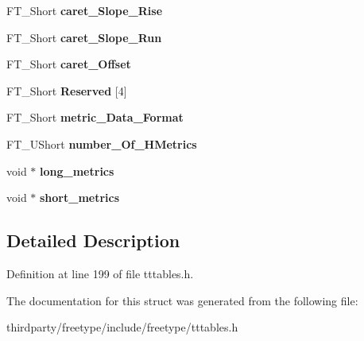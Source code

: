 \begin{DoxyCompactItemize}
\item 
\mbox{\label{struct_t_t___hori_header___aeb43d92f56de424d8f28bd389973eca4}} 
F\+T\+\_\+\+Short {\bfseries caret\+\_\+\+Slope\+\_\+\+Rise}
\item 
\mbox{\label{struct_t_t___hori_header___acce162ae0554006c11a3383bd3454d69}} 
F\+T\+\_\+\+Short {\bfseries caret\+\_\+\+Slope\+\_\+\+Run}
\item 
\mbox{\label{struct_t_t___hori_header___a791ad767d54cc87e84d9b03d6739f0eb}} 
F\+T\+\_\+\+Short {\bfseries caret\+\_\+\+Offset}
\item 
\mbox{\label{struct_t_t___hori_header___af2a2b374d8f81771fb75d3bdc96bcbf7}} 
F\+T\+\_\+\+Short {\bfseries Reserved} \mbox{[}4\mbox{]}
\item 
\mbox{\label{struct_t_t___hori_header___a0ed857e9629d2dfb5350a6b5976bf933}} 
F\+T\+\_\+\+Short {\bfseries metric\+\_\+\+Data\+\_\+\+Format}
\item 
\mbox{\label{struct_t_t___hori_header___aac3ecb9ba7c13436a663b91765e89647}} 
F\+T\+\_\+\+U\+Short {\bfseries number\+\_\+\+Of\+\_\+\+H\+Metrics}
\item 
\mbox{\label{struct_t_t___hori_header___a3eeb5766b461e9563b659a30e775fcc2}} 
void $\ast$ {\bfseries long\+\_\+metrics}
\item 
\mbox{\label{struct_t_t___hori_header___ae39107c4cfc3e7c1871dbb304bbe4a5a}} 
void $\ast$ {\bfseries short\+\_\+metrics}
\end{DoxyCompactItemize}


\subsection{Detailed Description}


Definition at line 199 of file tttables.\+h.



The documentation for this struct was generated from the following file\+:\begin{DoxyCompactItemize}
\item 
thirdparty/freetype/include/freetype/tttables.\+h\end{DoxyCompactItemize}
